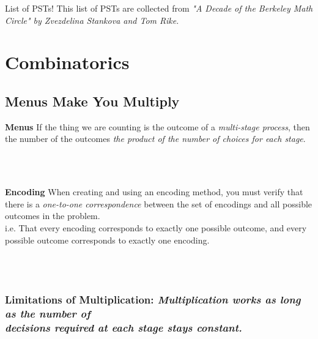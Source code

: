 \documentclass{article}
\begin{document}
\begin{mybox}{List of PSTs!}
This list of PSTs are collected from \textit{"A Decade of the Berkeley Math Circle" by Zvezdelina Stankova and Tom Rike.}\\
\begin{comment}
    \textit{Zveda if you ever see this I am sorry, you were my very favorite and taught me more than you know.}
\end{comment}
\end{mybox}\bigskip



\section*{Combinatorics}


\subsection*{Menus Make You Multiply}

\begin{mybox}{\pst \textbf{Menus}}
If the thing we are counting is the outcome of a \textit{multi-stage process}, then the number of the outcomes \textit{the product of the number of choices for each stage}. 
\end{mybox}
\\ \\


\begin{mybox}{\textbf{Encoding}}
When creating and using an encoding method, you must verify that there is a \textit{one-to-one correspondence} between the set of encodings and all possible outcomes in the problem. \\
i.e. That every encoding corresponds to exactly one possible outcome, and every possible outcome corresponds to exactly one encoding. 
\end{mybox}
\\ \\

\subsubsection*{\large Limitations of Multiplication: \textit{\small Multiplication works as long as the number of \\ decisions required at each stage stays constant.}}\bigskip
\end{document}
